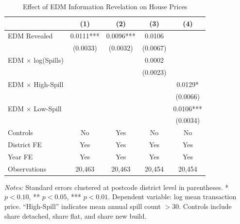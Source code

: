 \begin{table}[htbp]
\centering
\caption{Effect of EDM Information Revelation on House Prices}
\label{tab:main}
\begin{tabular}{lcccc}
\toprule
 & (1) & (2) & (3) & (4) \\
\midrule
EDM Revealed & 0.0111*** & 0.0096*** & 0.0106 & \\
 & (0.0033) & (0.0032) & (0.0067) & \\
EDM $\times$ log(Spills) & & & 0.0002 & \\
 & & & (0.0023) & \\
EDM $\times$ High-Spill & & & & 0.0129* \\
 & & & & (0.0066) \\
EDM $\times$ Low-Spill & & & & 0.0106*** \\
 & & & & (0.0034) \\
\midrule
Controls & No & Yes & No & No \\
District FE & Yes & Yes & Yes & Yes \\
Year FE & Yes & Yes & Yes & Yes \\
Observations & 20,463 & 20,463 & 20,454 & 20,454 \\
\bottomrule
\end{tabular}
\begin{tablenotes}[flushleft]\small
\item \textit{Notes:} Standard errors clustered at postcode district level in parentheses. * $p<0.10$, ** $p<0.05$, *** $p<0.01$. Dependent variable: log mean transaction price. ``High-Spill'' indicates mean annual spill count $>30$. Controls include share detached, share flat, and share new build.
\end{tablenotes}
\end{table}

